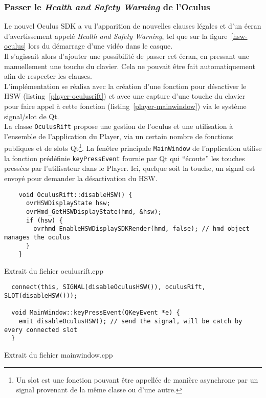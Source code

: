 \subsubsection{Passer le \textit{Health and Safety Warning} de l'Oculus}
Le nouvel Oculus SDK a vu l'apparition de nouvelles clauses légales et d'un écran
d'avertissement appelé \textit{Health and Safety Warning}, tel que sur la figure~\ref{hsw-oculus}
lors du démarrage d'une vidéo dans le casque\cite{oculus-developer-guide}.\\
Il s'agissait alors d'ajouter une possibilité de passer cet écran, en pressant une
manuellement une touche du clavier. Cela ne pouvait être fait automatiquement afin de respecter les clauses.
\ \\
L'implémentation se réalisa avec la création d'une fonction pour désactiver le HSW
(listing~\ref{player-oculusrift}) et avec une capture d'une touche du clavier pour faire appel à 
cette fonction (listing~\ref{player-mainwindow}) via le système signal/slot de Qt.\\
La classe \texttt{OculusRift} propose une gestion de l'oculus et une utilisation
à l'ensemble de l'application du Player, via un certain nombre de fonctions publiques
et de slots Qt\footnote{Un slot est une fonction pouvant être appellée de manière asynchrone 
par un signal provenant de la même classe ou d'une autre.}. La fenêtre principale \texttt{MainWindow}
de l'application utilise la fonction prédéfinie \texttt{keyPressEvent} fournie
par Qt qui \enquote{écoute} les touches pressées par l'utilisateur dans le Player.
Ici, quelque soit la touche, un signal est envoyé pour demander la désactivation du HSW.
\begin{listing}
  \begin{verbatim}
    void OculusRift::disableHSW() {
      ovrHSWDisplayState hsw;
      ovrHmd_GetHSWDisplayState(hmd, &hsw);
      if (hsw) {
        ovrhmd_EnableHSWDisplaySDKRender(hmd, false); // hmd object manages the oculus
      }
    }
  \end{verbatim}
  \caption{Extrait du fichier oculusrift.cpp}
  \label{player-oculusrift}
\end{listing}

\begin{listing}
  \begin{verbatim}
  connect(this, SIGNAL(disableOculusHSW()), oculusRift, SLOT(disableHSW()));
  
  void MainWindow::keyPressEvent(QKeyEvent *e) { 
    emit disableOculusHSW(); // send the signal, will be catch by every connected slot
  }
  \end{verbatim}
  \caption{Extrait du fichier mainwindow.cpp}
  \label{player-mainwindow}
\end{listing}


